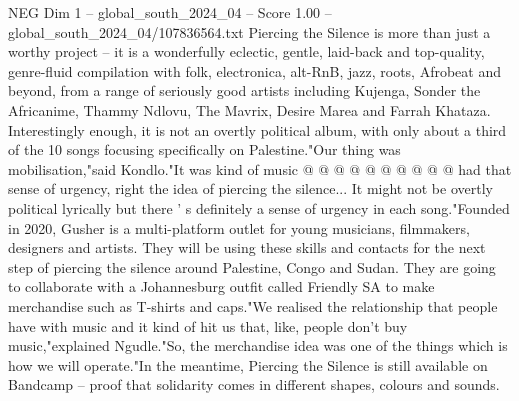 \begin{textsample}{NEG Dim 1 – global\_south\_2024\_04 – Score 1.00 – global\_south\_2024\_04/107836564.txt}
Piercing the Silence is more than just a worthy project -- it is a wonderfully eclectic, gentle, laid-back and top-quality, genre-fluid compilation with folk, electronica, alt-RnB, jazz, roots, Afrobeat and beyond, from a range of seriously good artists including Kujenga, Sonder the Africanime, Thammy Ndlovu, The Mavrix, Desire Marea and Farrah Khataza.
Interestingly enough, it is not an overtly political album, with only about a third of the 10 songs focusing specifically on Palestine."Our thing was mobilisation,"said Kondlo."It was kind of music @ @ @ @ @ @ @ @ @ @ had that sense of urgency, right the idea of piercing the silence...
It might not be overtly political lyrically but there ' s definitely a sense of urgency in each song."Founded in 2020, Gusher is a multi-platform outlet for young musicians, filmmakers, designers and artists.
They will be using these skills and contacts for the next step of piercing the silence around Palestine, Congo and Sudan.
They are going to collaborate with a Johannesburg outfit called Friendly SA to make merchandise such as T-shirts and caps."We realised the relationship that people have with music and it kind of hit us that, like, people don't buy music,"explained Ngudle."So, the merchandise idea was one of the things which is how we will operate."In the meantime, Piercing the Silence is still available on Bandcamp -- proof that solidarity comes in different shapes, colours and sounds.

\end{textsample}
